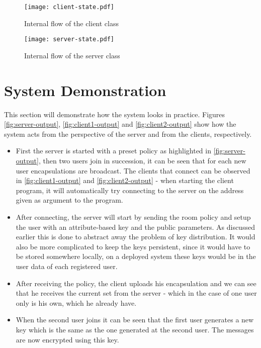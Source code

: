 \begin{figure}[H]
\centering
\texttt{[image: client-state.pdf]}
\caption{Internal flow of the client class}
\label{fig:client-state}
\end{figure}

\begin{figure}[h]
\centering
\texttt{[image: server-state.pdf]}
\caption{Internal flow of the server class}
\label{fig:server-state}
\end{figure}

\clearpage
\section{System Demonstration}\label{sec:demo}
This section will demonstrate how the system looks in practice. Figures \ref{fig:server-output}, \ref{fig:client1-output} and \ref{fig:client2-output} show how the system acts from the perspective of the server and from the clients, respectively. 
\begin{itemize}
\item First the server is started with a preset policy as highlighted in \ref{fig:server-output}, then two users join in succession, it can be seen that for each new user encapsulations are broadcast. The clients that connect can be observed in \ref{fig:client1-output} and \ref{fig:client2-output}  - when starting the client program, it will automatically try connecting to the server on the address given as argument to the program. 
\item After connecting, the server will start by sending the room policy and setup the user with an attribute-based key and the public parameters. As discussed earlier this is done to abstract away the problem of key distribution. It would also be more complicated to keep the keys persistent, since it would have to be stored somewhere locally, on a deployed system these keys would be in the user data of each registered user. 
\item After receiving the policy, the client uploads his encapsulation and we can see that he receives the current set from the server - which in the case of one user only is his own, which he already have. 
\item When the second user joins it can be seen that the first user generates a new key which is the same as the one generated at the second user. The messages are now encrypted using this key.
\end{itemize}


